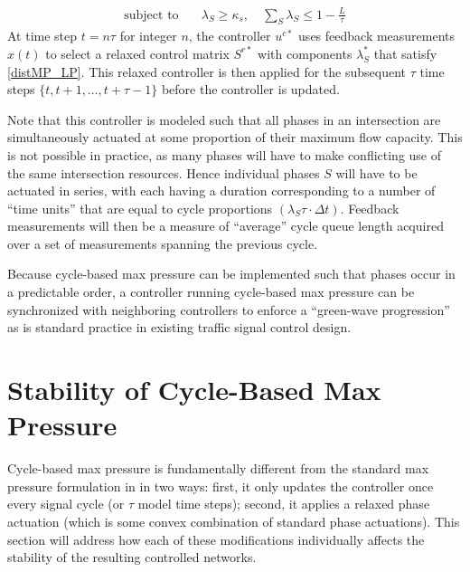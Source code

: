 \begin{align*}
\text{subject to} &\quad  \lambda_{S} \geq \kappa_s, \quad \sum_{S} \lambda_{S} \leq 1 - \tfrac{L}{\tau} 
\end{align*}
At time step $t=n\tau$ for integer $n$, the controller $u^{c*}$ uses feedback measurements $x(t)$ to select a relaxed control matrix $S^{r*}$ with components $\lambda_S^*$ that satisfy \eqref{distMP_LP}. This relaxed controller is then applied for the subsequent $\tau$ time steps $\{t, t+1, \ldots, t+\tau-1\}$ before the controller is updated. 

Note that this controller is modeled such that all phases in an intersection are simultaneously actuated at some proportion of their maximum flow capacity. This is not possible in practice, as many phases will have to make conflicting use of the same intersection resources. Hence individual phases $S$ will have to be actuated in series, with each having a duration corresponding to a number of ``time units'' that are equal to cycle proportions $(\lambda_S \tau\cdot  \Delta t)$. Feedback measurements will then be a measure of ``average'' cycle queue length acquired over a set of measurements spanning the previous cycle.  

Because cycle-based max pressure can be implemented such that phases occur in a predictable order, a controller running cycle-based max pressure can be synchronized with neighboring controllers to enforce a ``green-wave progression'' as is standard practice in existing traffic signal control design. 

\section{Stability of Cycle-Based Max Pressure}
Cycle-based max pressure is fundamentally different from the standard max pressure formulation in \cite{Varaiya2013} in two ways: first, it only updates the controller once every signal cycle (or $\tau$ model time steps); second, it applies a relaxed phase actuation (which is some convex combination of standard phase actuations). This section will address how each of these modifications individually affects the stability of the resulting controlled networks. 

